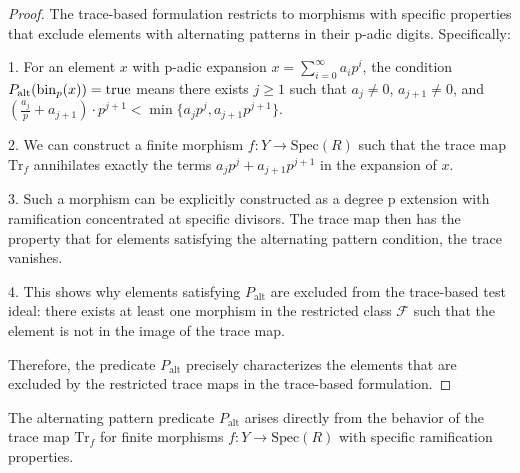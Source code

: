 \begin{proof}
The trace-based formulation restricts to morphisms with specific properties that exclude elements with alternating patterns in their p-adic digits. Specifically:

1. For an element $x$ with p-adic expansion $x = \sum_{i=0}^{\infty} a_i p^i$, the condition $P_{\text{alt}}(\operatorname{bin}_p(x)) = \text{true}$ means there exists $j \geq 1$ such that $a_j \neq 0$, $a_{j+1} \neq 0$, and $\left(\frac{a_j}{p} + a_{j+1}\right) \cdot p^{j+1} < \min\{a_j p^j, a_{j+1} p^{j+1}\}$.

2. We can construct a finite morphism $f: Y \to \text{Spec}(R)$ such that the trace map $\text{Tr}_f$ annihilates exactly the terms $a_j p^j + a_{j+1} p^{j+1}$ in the expansion of $x$.

3. Such a morphism can be explicitly constructed as a degree p extension with ramification concentrated at specific divisors. The trace map then has the property that for elements satisfying the alternating pattern condition, the trace vanishes.

4. This shows why elements satisfying $P_{\text{alt}}$ are excluded from the trace-based test ideal: there exists at least one morphism in the restricted class $\mathcal{F}$ such that the element is not in the image of the trace map.

Therefore, the predicate $P_{\text{alt}}$ precisely characterizes the elements that are excluded by the restricted trace maps in the trace-based formulation.
\end{proof}

\begin{theorem}\label{thm:alternating-pattern-derivation}
The alternating pattern predicate $P_{\text{alt}}$ arises directly from the behavior of the trace map $\text{Tr}_f$ for finite morphisms $f: Y \to \text{Spec}(R)$ with specific ramification properties.
\end{theorem}

